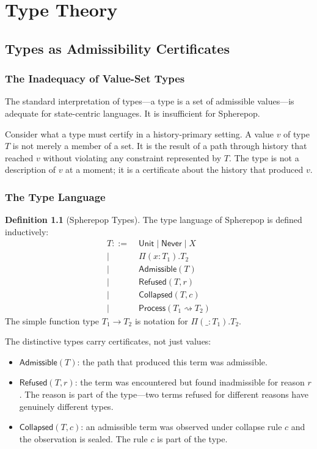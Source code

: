 \documentclass[12pt, a4paper, openany]{book}
\theoremstyle{plain}
\theoremstyle{definition}
\newtheorem{definition}[theorem]{Definition}
\theoremstyle{remark}
\newcommand{\Adm}{\mathsf{Admissible}}
\newcommand{\Rfsd}{\mathsf{Refused}}
\newcommand{\Col}{\mathsf{Collapsed}}
\newcommand{\Proc}{\mathsf{Process}}
\begin{document}
\part{Type Theory}

\chapter{Types as Admissibility Certificates}

\section{The Inadequacy of Value-Set Types}

The standard interpretation of types---a type is a set of admissible values---is
adequate for state-centric languages. It is insufficient for Spherepop.

Consider what a type must certify in a history-primary setting. A value $v$ of
type $T$ is not merely a member of a set. It is the result of a path through
history that reached $v$ without violating any constraint represented by $T$.
The type is not a description of $v$ at a moment; it is a certificate about the
history that produced $v$.

\section{The Type Language}

\begin{definition}[Spherepop Types]
The type language of Spherepop is defined inductively:
\begin{align*}
T ::=\; & \mathsf{Unit} \mid \mathsf{Never} \mid X \\
\mid\; & \Pi(x : T_1).T_2 \\
\mid\; & \Adm(T) \\
\mid\; & \Rfsd(T, r) \\
\mid\; & \Col(T, c) \\
\mid\; & \Proc(T_1 \rightsquigarrow T_2)
\end{align*}
The simple function type $T_1 \to T_2$ is notation for $\Pi(\_ : T_1).T_2$.
\end{definition}

The distinctive types carry certificates, not just values:
\begin{itemize}
\item $\Adm(T)$: the path that produced this term was admissible.
\item $\Rfsd(T, r)$: the term was encountered but found inadmissible for reason
$r$. The reason is part of the type---two terms refused for different reasons
have genuinely different types.
\item $\Col(T, c)$: an admissible term was observed under collapse rule $c$ and
the observation is sealed. The rule $c$ is part of the type.
\end{itemize}
\end{document}
